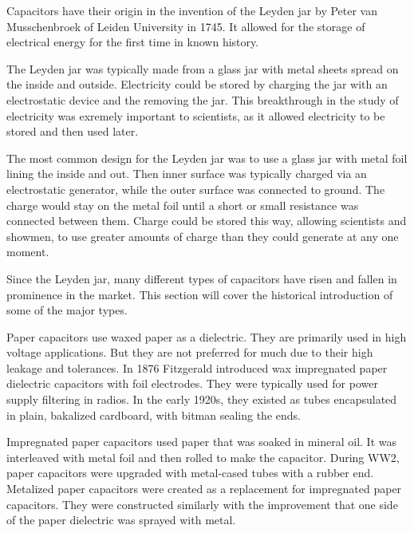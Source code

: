 \noindent Capacitors have their origin in the invention of the Leyden jar by Peter van Musschenbroek of Leiden University in 1745. \cite{empLight} It allowed for the storage of electrical energy for the first time in known history. 

\noindent The Leyden jar was typically made from a glass jar with metal sheets spread on the inside and outside. Electricity could be stored by charging the jar with an electrostatic device and the removing the jar. This breakthrough in the study of electricity was exremely important to scientists, as it allowed electricity to be stored and then used later.
\cite{ieee_hist} 

\noindent The most common design for the Leyden jar was to use a glass jar with metal foil lining the inside and out. Then inner surface was typically charged via an electrostatic generator, while the outer surface was connected to ground. The charge would stay on the metal foil until a short or small resistance was connected between them. Charge could be stored this way, allowing scientists and showmen, to use greater amounts of charge than they could generate at any one moment.

\noindent Since the Leyden jar, many different types of capacitors have risen and fallen in prominence in the market. This section will cover the historical introduction of some of the major types.

\noindent Paper capacitors use waxed paper as a dielectric. They are primarily used in high voltage applications. But they are not preferred for much due to their high leakage and tolerances.\cite{learn_caps} In 1876 Fitzgerald introduced wax impregnated paper dielectric capacitors with foil electrodes.\cite[ch.~11]{dumInv} \cite{learn_caps} They were typically used for power supply filtering in radios. In the early 1920s, they existed as tubes encapsulated in plain, bakalized cardboard, with bitman sealing the ends.\cite[ch~3]{dumInv}

\noindent Impregnated paper capacitors used paper that was soaked in mineral oil. It was interleaved with metal foil and then rolled to make the capacitor.\cite[ch.~8.2.1.1]{poorIntro} \noindent During WW2, paper capacitors were upgraded with metal-cased tubes with a rubber end.\cite[ch.~8.1]{poorIntro} Metalized paper capacitors were created as a replacement for impregnated paper capacitors. They were constructed similarly with the improvement that one side of the paper dielectric was sprayed with metal.\cite{hist_cerFilt}

